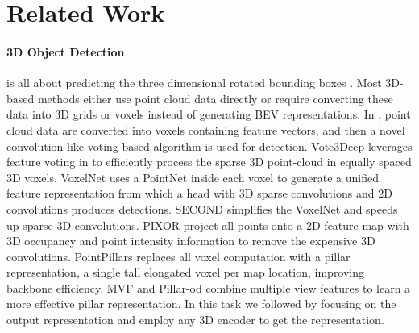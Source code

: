 \documentclass[10pt,twocolumn,letterpaper]{article}
\begin{document}
\section{Related Work}

\paragraph{3D Object Detection} is all about predicting the three dimensional rotated bounding boxes \cite{geiger2012we, lang2019pointpillars, qi2018frustum, yan2018second, yang20203dssd, yang2019std}. Most 3D-based methods either use point cloud data directly or require converting these data into 3D grids or voxels instead of generating BEV representations. In \cite{wang2015voting}, point cloud data are converted into voxels containing feature vectors, and then a novel convolution-like voting-based algorithm is used for detection. Vote3Deep \cite{engelcke2017vote3deep} leverages feature voting in \cite{wang2015voting} to efficiently process the sparse 3D point-cloud in equally spaced 3D voxels. VoxelNet \cite{zhou2018voxelnet} uses a PointNet \cite{qi2017pointnet} inside each voxel to generate a unified feature representation from which a head with 3D sparse convolutions \cite{graham20183d} and 2D convolutions produces detections. SECOND \cite{yan2018second} simplifies the VoxelNet and speeds up sparse 3D convolutions. PIXOR \cite{yang2018pixor} project all points onto a 2D feature map with 3D occupancy and point intensity information to remove the expensive 3D convolutions. PointPillars\cite{lang2019pointpillars} replaces all voxel computation with a pillar representation, a single tall elongated voxel per map location, improving backbone efficiency. MVF \cite{zhou2020end} and Pillar-od \cite{wang2020pillar} combine multiple view features to learn a more effective pillar representation. In this task we followed \cite{yin2020center, ge2020afdet} by focusing on the output representation and employ any 3D encoder to get the representation.
\end{document}
